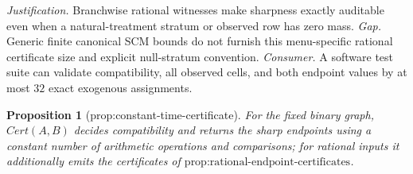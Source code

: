 \documentclass{article}
\newtheorem{proposition}{Proposition}
\begin{document}
\par\smallskip\noindent \textit{Justification.} Branchwise rational witnesses make sharpness exactly auditable even when a natural-treatment stratum or observed row has zero mass. \textit{Gap.} Generic finite canonical SCM bounds do not furnish this menu-specific rational certificate size and explicit null-stratum convention. \textit{Consumer.} A software test suite can validate compatibility, all observed cells, and both endpoint values by at most \(32\) exact exogenous assignments.

\begin{proposition}[prop:constant-time-certificate]\label{prop:constant-time-certificate}
For the fixed binary graph, \(Cert(A,B)\) decides compatibility and returns the sharp endpoints using a constant number of arithmetic operations and comparisons; for rational inputs it additionally emits the certificates of \(\text{prop:rational-endpoint-certificates}\).
\end{proposition}
\end{document}
